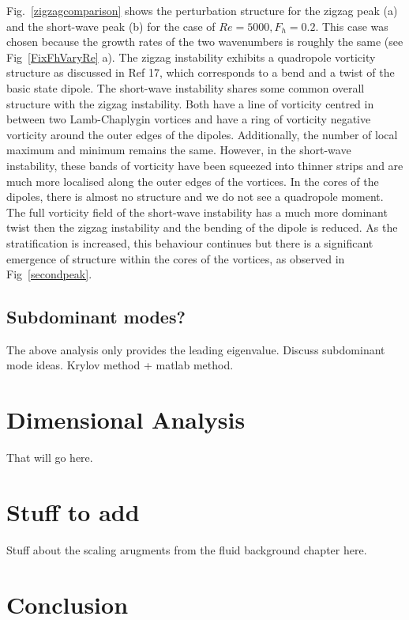 Fig.~\ref{zigzagcomparison} shows the perturbation structure for the zigzag peak (a) and the short-wave peak (b) for the case of $Re=5000,F_{h}=0.2$. This case was chosen because the growth rates of the two wavenumbers is roughly the same (see Fig~\ref{FixFhVaryRe} a). The zigzag instability exhibits a quadropole vorticity structure as discussed in Ref 17\nocite{bc2000c}, which corresponds to a bend and a twist of the basic state dipole. The short-wave instability shares some common overall structure with the zigzag instability. Both have a line of vorticity centred in between two Lamb-Chaplygin vortices and have a ring of vorticity negative vorticity around the outer edges of the dipoles. Additionally, the number of local maximum and minimum remains the same. However, in the short-wave instability, these bands of vorticity have been squeezed into thinner strips and are much more localised along the outer edges of the vortices. In the cores of the dipoles, there is almost no structure and we do not see a quadropole moment. The full vorticity field of the short-wave instability has a much more dominant twist then the zigzag instability and the bending of the dipole is reduced. As the stratification is increased, this behaviour continues but there is a significant emergence of structure within the cores of the vortices, as observed in Fig~\ref{secondpeak}.


\subsection{Subdominant modes?} 
The above analysis only provides the leading eigenvalue. Discuss subdominant mode ideas. Krylov method + matlab method.
\section{Dimensional Analysis}
That will go here. 


\section{Stuff to add}
Stuff about the scaling arugments from the fluid background chapter here.
\section{Conclusion}

